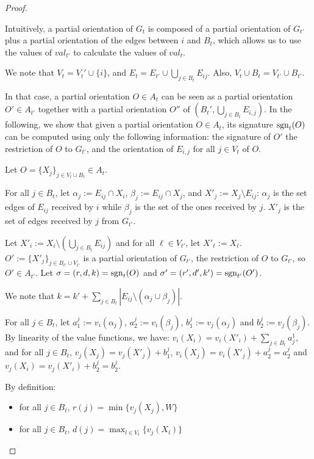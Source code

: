 \begin{proof}
\begin{lemma}
    \end{lemma}

    Intuitively, a partial orientation of $G_t$ is composed of a partial orientation of $G_{t'}$ plus a partial orientation of the edges between $i$ and $B_t$, which allows us to use the values of $val_{t'}$ to calculate the values of $val_t$.

    \begin{nestedproof}

    We note that $V_t=V_t'\cup \{i\}$, and $E_t=E_{t'}\cup \bigcup_{j\in B_t} E_{ij}$. Also, $V_t\cup B_t=V_{t'}\cup B_{t'}$.

    In that case, a partial orientation $O\in A_t$ can be seen as a partial orientation $O'\in A_{t'}$ together with a partial orientation $O''$ of $(B_t',\bigcup_{j\in B_t} E_{i,j})$. In the following, we show that given a partial orientation $O\in A_t$, its signature $\operatorname{sgn}_t(O)$ can be computed using only the following information: the signature of $O'$ the restriction of $O$ to $G_{t'}$, and the orientation of $E_{i,j}$ for all $j\in V_t$ of $O$.

    Let $O=\{X_j\}_{j\in V_t\cup B_t}\in A_t$.

    For all $j\in B_t$, let $\alpha_j:=E_{ij}\cap X_i$, $\beta_j:=E_{ij}\cap X_j$, and $X'_j:=X_j\setminus E_{ij}$: $\alpha_j$ is the set edges of $E_{ij}$ received by $i$ while $\beta_j$ is the set of the ones received by $j$. $X'_j$ is the set of edges received by $j$ from $G_{t'}$.

    Let $X'_i:=X_i\setminus (\bigcup_{j\in B_t}E_{ij})$ and for all $\ell\in V_{t'}$, let $X'_\ell:=X_\ell$.  $O':= \{X'_j\}_{j\in B_{t'}\cup V_{t'}}$ is a partial orientation of $G_{t'}$, the restriction of $O$ to $G_{t'}$, so $O'\in A_{t'}$. Let $\sigma=(r,d,k)=\operatorname{sgn}_t(O)$ and $\sigma'=(r',d',k')=\operatorname{sgn}_{t'}(O')$.

    We note that $k=k'+\sum_{j\in B_t}|E_{ij}\setminus(\alpha_j\cup\beta_j)|$.

    For all $j\in B_t$, let $a^j_1:= v_i(\alpha_j)$, $a^j_2:= v_i(\beta_j)$, $b^j_1:= v_j(\alpha_j)$ and $b^j_2:= v_j(\beta_j)$. By linearity of the value functions, we have: $v_i(X_i)=v_i(X'_i)+\sum_{j\in B_t}a_j^1$, and for all $j\in B_t$, $v_j(X_j)=v_j(X'_j)+b^j_1$, $v_i(X_j)=v_i(X'_j)+a_2^j=a_2^j$ and $v_j(X_i)=v_j(X'_i)+b_2^j=b_2^j$.

    By definition:\begin{itemize}
        \item for all $j\in B_t$, $r(j)=\min\{v_{j}(X_{j}),W\}$
        \item for all $j\in B_t$, $d(j)=\max_{l\in V_t}\{v_j(X_l)\}$
    \end{itemize}



\end{nestedproof}
\end{proof}
